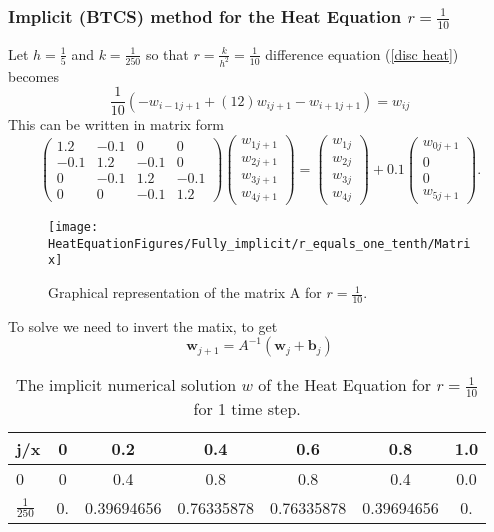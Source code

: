 \begin{example}
\subsubsection{Implicit (BTCS) method for the Heat Equation  $r=\frac{1}{10}$}
Let $h=\frac{1}{5}$ and $k=\frac{1}{250}$ so that $r=\frac{k}{h^2}=\frac{1}{10}$
difference equation (\ref{disc heat}) becomes
\[
\frac{1}{10}(-w_{i-1j+1}+(12)w_{ij+1}-w_{i+1j+1})=w_{ij}
\]
This can be written in matrix form 
\[
\left(\begin{array}{cccc}
1.2&-0.1&0&0\\
-0.1&1.2&-0.1&0\\
0&-0.1&1.2&-0.1\\
0&0&-0.1&1.2
\end{array}\right)
\left(\begin{array}{c}
w_{1j+1}\\
w_{2j+1}\\
w_{3j+1}\\
w_{4j+1}
\end{array}\right)
=
\left(\begin{array}{c}
w_{1j}\\
w_{2j}\\
w_{3j}\\
w_{4j}
\end{array}\right)+0.1\left(\begin{array}{c}
w_{0j+1}\\
0\\
0\\
w_{5j+1}
\end{array}\right).
\]
\begin{figure}[H]
  \caption{Graphical representation of the matrix A for $r=\frac{1}{10}$. }
  \centering
    \texttt{[image: HeatEquationFigures/Fully\_implicit/r\_equals\_one\_tenth/Matrix]}
\end{figure}


To solve we need to invert the matix, to get
\[ \mathbf{w}_{j+1}=A^{-1}(\mathbf{w}_{j} +\mathbf{b}_{j}) \]


\begin{center}
 \begin{table}[H]
 \caption{The implicit numerical solution $w$ of the Heat Equation for $r=\frac{1}{10}$ for 1 time step.}
 \centering
\begin{tabular}{l|cccccc}
j/x&0&0.2&0.4&0.6&0.8&1.0\\ \hline
0&0&0.4&0.8&0.8&0.4&0.0\\
$\frac{1}{250}$&
 0.&          0.39694656 & 0.76335878 & 0.76335878 & 0.39694656&  0.
\end{tabular}
\end{table}
\end{center}


\end{example}

